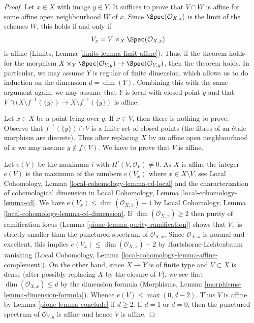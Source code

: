 \begin{proof}

Let $x \in X$ with image $y \in Y$. It suffices to prove that
$V \cap W$ is affine for some affine open neighbourhood $W$ of $x$.
Since $\Spec(\mathcal{O}_{X, x})$ is the limit of the schemes $W$,
this holds if and only if
$$
V_x = V \times_X \Spec(\mathcal{O}_{X, x})
$$
is affine (Limits, Lemma \ref{limits-lemma-limit-affine}).
Thus, if the theorem holds for the morphism
$X \times_Y \Spec(\mathcal{O}_{Y, y}) \to \Spec(\mathcal{O}_{Y, y})$,
then the theorem holds. In particular, we may assume $Y$
is regular of finite dimension, which allows us to do induction
on the dimension $d = \dim(Y)$. Combining this with the same argument again,
we may assume that $Y$ is local with closed point $y$ and that
$V \cap (X \setminus f^{-1}(\{y\}) \to X \setminus f^{-1}(\{y\})$
is affine.

\medskip\noindent
Let $x \in X$ be a point lying over $y$. If $x \in V$, then
there is nothing to prove. Observe that  $f^{-1}(\{y\}) \cap V$
is a finite set of closed points (the fibres of an \'etale morphism
are discrete). Thus after replacing $X$
by an affine open neighbourhood of $x$ we may assume
$y \not \in f(V)$. We have to prove that $V$ is affine.

\medskip\noindent
Let $e(V)$ be the maximum $i$ with $H^i(V, \mathcal{O}_V) \not = 0$.
As $X$ is affine the integer $e(V)$ is the maximum of the numbers $e(V_x)$
where $x \in X \setminus V$, see
Local Cohomology, Lemma \ref{local-cohomology-lemma-cd-local}
and the characterization of cohomological dimension
in Local Cohomology, Lemma \ref{local-cohomology-lemma-cd}.
We have $e(V_x) \leq \dim(\mathcal{O}_{X, x}) - 1$ by
Local Cohomology, Lemma \ref{local-cohomology-lemma-cd-dimension}.
If $\dim(\mathcal{O}_{X, x}) \geq 2$ then purity of
ramification locus (Lemma \ref{pione-lemma-purity-ramification})
shows that $V_x$ is strictly smaller than the punctured spectrum of
$\mathcal{O}_{X, x}$. Since $\mathcal{O}_{X, x}$ is
normal and excellent, this implies
$e(V_x) \leq \dim(\mathcal{O}_{X, x}) - 2$ by
Hartshorne-Lichtenbaum vanishing
(Local Cohomology, Lemma \ref{local-cohomology-lemma-affine-complement}).
On the other hand, since $X \to Y$ is of finite type
and $V \subset X$ is dense (after possibly replacing $X$
by the closure of $V$), we see that $\dim(\mathcal{O}_{X, x}) \leq d$
by the dimension formula
(Morphisms, Lemma \ref{morphisms-lemma-dimension-formula}).
Whence $e(V) \leq \max(0, d -  2)$.
Thus $V$ is affine by Lemma \ref{pione-lemma-conclude}
if $d \geq 2$. If $d = 1$ or $d = 0$, then the punctured spectrum of
$\mathcal{O}_{Y, y}$ is affine and hence $V$ is affine.
\end{proof}

